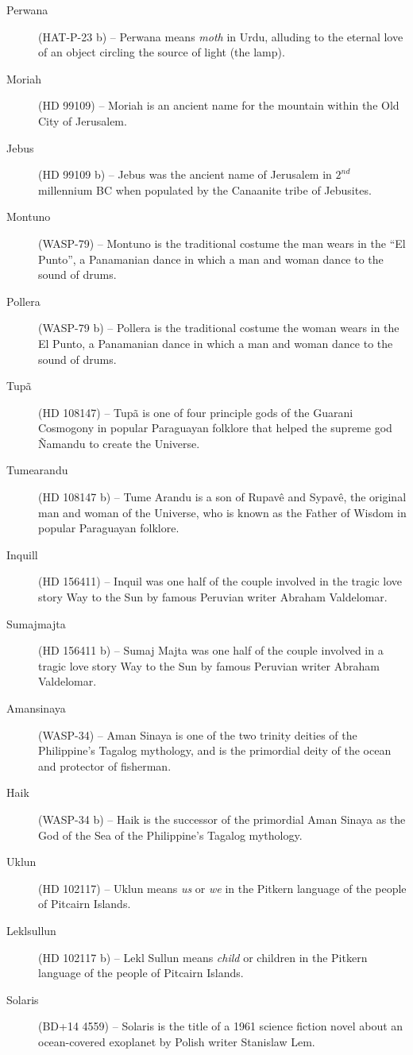 \begin{description}
\item[Perwana] (HAT-P-23 b) -- Perwana means \textit{moth} in Urdu, alluding to the eternal love of an object circling the source of light (the lamp).
\item[Moriah] (HD 99109) -- Moriah is an ancient name for the mountain within the Old City of Jerusalem.
\item[Jebus] (HD 99109 b) -- Jebus was the ancient name of Jerusalem in $2^{nd}$ millennium BC when populated by the Canaanite tribe of Jebusites.
\item[Montuno] (WASP-79) -- Montuno is the traditional costume the man wears in the ``El Punto'', a Panamanian dance in which a man and woman dance to the sound of drums.
\item[Pollera] (WASP-79 b) -- Pollera is the traditional costume the woman wears in the El Punto, a Panamanian dance in which a man and woman dance to the sound of drums.
\item[Tupã] (HD 108147) -- Tupã is one of four principle gods of the Guarani Cosmogony in popular Paraguayan folklore that helped the supreme god Ñamandu to create the Universe.
\item[Tumearandu] (HD 108147 b) -- Tume Arandu is a son of Rupavê and Sypavê, the original man and woman of the Universe, who is known as the Father of Wisdom in popular Paraguayan folklore.
\item[Inquill] (HD 156411) -- Inquil was one half of the couple involved in the tragic love story Way to the Sun by famous Peruvian writer Abraham Valdelomar.
\item[Sumajmajta] (HD 156411 b) -- Sumaj Majta was one half of the couple involved in a tragic love story Way to the Sun by famous Peruvian writer Abraham Valdelomar.
\item[Amansinaya] (WASP-34) -- Aman Sinaya is one of the two trinity deities of the Philippine's Tagalog mythology, and is the primordial deity of the ocean and protector of fisherman.
\item[Haik] (WASP-34 b) -- Haik is the successor of the primordial Aman Sinaya as the God of the Sea of the Philippine's Tagalog mythology.
\item[Uklun] (HD 102117) -- Uklun means \textit{us} or \textit{we} in the Pitkern language of the people of Pitcairn Islands.
\item[Leklsullun] (HD 102117 b) -- Lekl Sullun means \textit{child} or children in the Pitkern language of the people of Pitcairn Islands.
\item[Solaris] (BD+14 4559) -- Solaris is the title of a 1961 science fiction novel about an ocean-covered exoplanet by Polish writer Stanislaw Lem.

\end{description}
